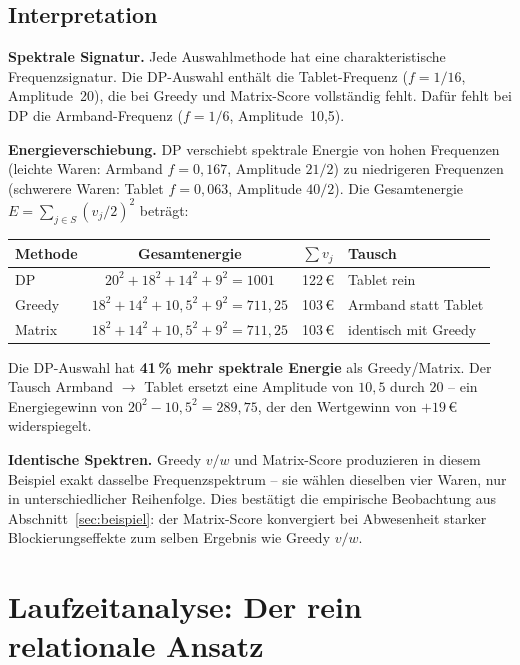 \documentclass[a4paper,11pt]{article}
\begin{document}
\subsection{Interpretation}

\textbf{Spektrale Signatur.}
Jede Auswahlmethode hat eine charakteristische Frequenzsignatur.
Die DP-Auswahl enthält die Tablet-Frequenz ($f=1/16$, Amplitude~20),
die bei Greedy und Matrix-Score vollständig fehlt.
Dafür fehlt bei DP die Armband-Frequenz ($f=1/6$, Amplitude~10{,}5).

\medskip
\noindent
\textbf{Energieverschiebung.}
DP verschiebt spektrale Energie von hohen Frequenzen (leichte Waren:
Armband $f=0{,}167$, Amplitude $21/2$) zu niedrigeren Frequenzen
(schwerere Waren: Tablet $f=0{,}063$, Amplitude $40/2$).
Die Gesamtenergie
$E = \sum_{j \in S} (v_j/2)^2$
beträgt:

\begin{center}
\small
\begin{tabular}{lccl}
\toprule
Methode & Gesamtenergie & $\sum v_j$ & Tausch \\
\midrule
DP      & $20^2+18^2+14^2+9^2 = 1001$ & 122\,\euro
  & Tablet rein \\
Greedy  & $18^2+14^2+10{,}5^2+9^2 = 711{,}25$ & 103\,\euro
  & Armband statt Tablet \\
Matrix  & $18^2+14^2+10{,}5^2+9^2 = 711{,}25$ & 103\,\euro
  & identisch mit Greedy \\
\bottomrule
\end{tabular}
\end{center}

\noindent
Die DP-Auswahl hat \textbf{41\,\% mehr spektrale Energie} als
Greedy/Matrix. Der Tausch Armband $\to$ Tablet ersetzt eine
Amplitude von $10{,}5$ durch $20$ -- ein Energiegewinn von
$20^2 - 10{,}5^2 = 289{,}75$, der den Wertgewinn von
$+19$\,\euro{} widerspiegelt.

\medskip
\noindent
\textbf{Identische Spektren.}
Greedy $v/w$ und Matrix-Score produzieren in diesem Beispiel
exakt dasselbe Frequenzspektrum -- sie wählen dieselben vier
Waren, nur in unterschiedlicher Reihenfolge.
Dies bestätigt die empirische Beobachtung aus
Abschnitt~\ref{sec:beispiel}: der Matrix-Score konvergiert
bei Abwesenheit starker Blockierungseffekte zum selben Ergebnis
wie Greedy $v/w$.

\section{Laufzeitanalyse: Der rein relationale Ansatz}
\label{sec:runtime}
\end{document}

